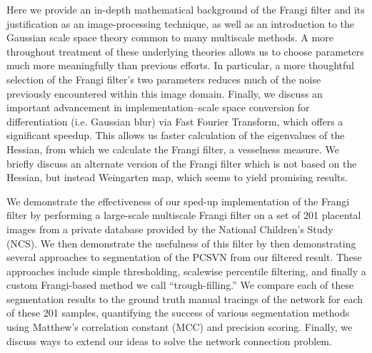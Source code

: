 Here we provide an in-depth mathematical background of the Frangi filter and
its justification as an image-processing technique, as well as an introduction
to the Gaussian scale space theory common to many multiscale methods. A more throughout
treatment of these underlying theories allows us to choose parameters much more meaningfully than previous efforts. In particular, a more thoughtful selection of the Frangi filter's two parameters reduces much of the noise previously encountered within this image domain.  Finally,
we discuss an important advancement in implementation--scale space conversion
for differentiation (i.e. Gaussian blur) via Fast Fourier Transform, which
offers a significant speedup. This allows us faster calculation of the
eigenvalues of the Hessian, from which we calculate the Frangi filter, a
vesselness measure. We briefly discuss an alternate version of the Frangi filter which is not based on the Hessian, but instead Weingarten map, which seems to yield promising results.

We demonstrate the effectiveness of our sped-up implementation of the Frangi
filter by performing a large-scale multiscale Frangi filter on a set of 201
placental images from a private database provided by the National Children's
Study (NCS). We then demonstrate the usefulness of this filter by
then demonstrating several approaches to segmentation
of the PCSVN from our filtered result. These approaches include simple thresholding,
scalewise percentile filtering, and finally a custom Frangi-based method we call ``trough-filling.''
We compare each of these segmentation results to
the ground truth manual tracings of the network for each of these 201 samples, quantifying the success of various segmentation methods using Matthew's correlation constant (MCC) and precision scoring. Finally, we discuss ways to extend our ideas to solve the network connection problem.